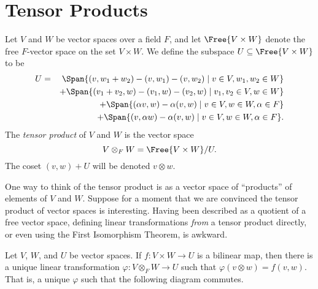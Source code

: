 \documentclass{memoir}
\begin{document}
\section{Tensor Products}

\begin{dfn}
Let $V$ and $W$ be vector spaces over a field $F$, and let $\Free{V \times W}$ denote the free $F$-vector space on the set $V \times W$. We define the subspace $U \subseteq \Free{V \times W}$ to be
\begin{eqnarray*}
U & = & \Span{(v,w_1+w_2) - (v,w_1) - (v,w_2) \mid v \in V, w_1,w_2 \in W} \\
  &   & + \Span{(v_1+v_2,w) - (v_1,w) - (v_2,w) \mid v_1,v_2 \in V, w \in W} \\
  &   & + \Span{(\alpha v, w) - \alpha (v, w) \mid v \in V, w \in W, \alpha \in F} \\
  &   & + \Span{(v, \alpha w) - \alpha (v, w) \mid v \in V, w \in W, \alpha \in F}.
\end{eqnarray*}
The \emph{tensor product} of $V$ and $W$ is the vector space \[ V \otimes_F W = \Free{V \times W}/U. \] The coset $(v,w) + U$ will be denoted $v \otimes w$.
\end{dfn}

One way to think of the tensor product is as a vector space of ``products'' of elements of $V$ and $W$. Suppose for a moment that we are convinced the tensor product of vector spaces is interesting. Having been described as a quotient of a free vector space, defining linear transformations \emph{from} a tensor product directly, or even using the First Isomorphism Theorem, is awkward.

\begin{prp}
Let $V$, $W$, and $U$ be vector spaces. If $f : V \times W \rightarrow U$ is a bilinear map, then there is a unique linear transformation $\varphi : V \otimes_F W \rightarrow U$ such that $\varphi(v \otimes w) = f(v,w)$. That is, a unique $\varphi$ such that the following diagram commutes.

\begin{center}
\end{center}
\end{prp}
\end{document}

